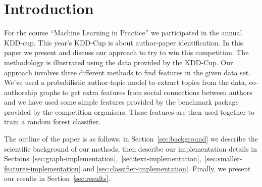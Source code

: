 \section{Introduction}

For the course ``Machine Learning in Practice'' we participated in the annual KDD-cup.
This year's KDD-Cup is about author-paper identification.
In this paper we present and discuss our approach to try to win this competition.
The methodology is illustrated using the data provided by the KDD-Cup.
Our approach involves three different methods to find features in the given data set.
We've used a probabilistic author-topic model\cite{steyvers2004probabilistic} to extract topics from  the data, co-authorship graphs to get extra features from social connections between authors and we have used some simple features provided by the benchmark package provided by the competition organisers.
These features are then used together to train a random forest classifier.

The outline of the paper is as follows: in Section~\ref{sec:background} we describe the scientific background of our methods, then describe our implementation details in Sections~\ref{sec:graph-implementation},~\ref{sec:text-implementation},~\ref{sec:smaller-features-implementation} and \ref{sec:classifier-implementation}. Finally, we present our results in Section~\ref{sec:results}.
